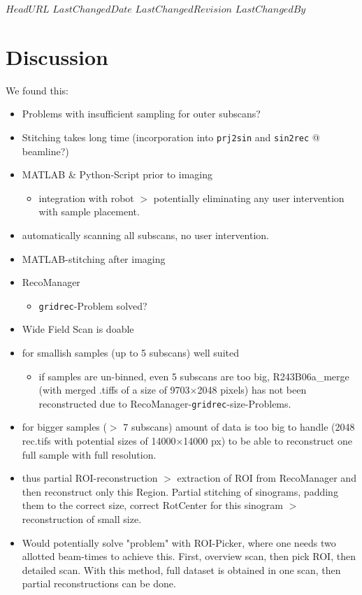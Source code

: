 \svnidlong
{$HeadURL$}
{$LastChangedDate$}
{$LastChangedRevision$}
{$LastChangedBy$}

\begin{center}
\end{center}

\section{Discussion}
We found this:
\begin{itemize}
	\item Problems with insufficient sampling for outer subscans?
	\item Stitching takes long time (incorporation into \verb+prj2sin+ and \verb+sin2rec+ @ beamline?)
	\item MATLAB \& Python-Script prior to imaging
	\begin{itemize}
		\item integration with robot $>$ potentially eliminating any user intervention with sample placement.
	\end{itemize}
	\item automatically scanning all subscans, no user intervention.
	\item MATLAB-stitching after imaging
	\item RecoManager
	\begin{itemize}
		\item \verb+gridrec+-Problem solved?
	\end{itemize}
	\item Wide Field Scan is doable
	\item for smallish samples (up to 5 subscans) well suited
	\begin{itemize}
		\item if samples are un-binned, even 5 subscans are too big, R243B06a\_merge (with merged .tiffs of a size of 9703$\times$2048 pixels) has not been reconstructed due to RecoManager-\verb+gridrec+-size-Problems.
	\end{itemize}
	\item for bigger samples ($>$ 7 subscans) amount of data is too big to handle (2048 rec.tifs with potential sizes of 14000$\times$14000 px) to be able to reconstruct one full sample with full resolution.
	\item thus partial ROI-reconstruction $>$ extraction of ROI from RecoManager and then reconstruct only this Region. Partial stitching of sinograms, padding them to the correct size, correct RotCenter for this sinogram $>$ reconstruction of small size.
	\item Would potentially solve "problem" with ROI-Picker, where one needs two allotted beam-times to achieve this. First, overview scan, then pick ROI, then detailed scan. With this method, full dataset is obtained in one scan, then partial reconstructions can be done.
\end{itemize}